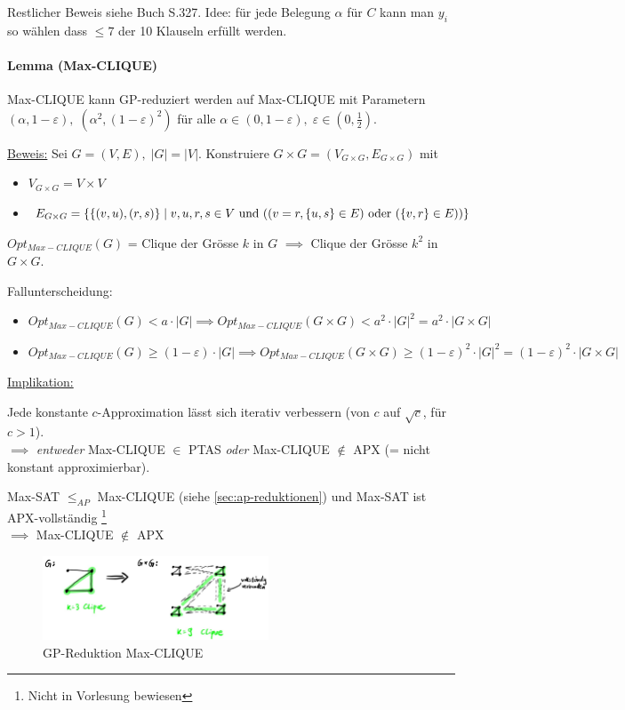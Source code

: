 Restlicher Beweis siehe Buch S.327.
Idee: für jede Belegung $\alpha$ für $C$ kann man $y_i$ so wählen dass $\leq 7$ der 10 Klauseln
erfüllt werden.

\paragraph{Lemma (Max-CLIQUE)}
Max-CLIQUE kann GP-reduziert werden auf Max-CLIQUE mit Parametern
$(\alpha, 1-\varepsilon), \; (\alpha^2, (1-\varepsilon)^2)$
für alle $\alpha \in (0, 1-\varepsilon), \; \varepsilon \in (0, \frac{1}{2})$.

\underline{Beweis:}
Sei $G=(V,E), \; |G|=|V|$.
Konstruiere $G \times G = ( V_{G \times G}, E_{G \times G} )$ mit
\begin{itemize}
    \item $V_{G \times G} = V \times V$
    \item $E_{G \times G} = \left\{ \{ (v,u) , (r,s) \} \; | \; v,u,r,s \in V \text{ und }
    ( ( v=r , \{u,s\} \in E) \text{ oder } (\{v,r\} \in E) ) \right\}$
\end{itemize}

$Opt_{Max-CLIQUE}(G)$ = Clique der Grösse $k$ in $G$ $\implies$ Clique der Grösse $k^2$ in $G \times G$.

Fallunterscheidung:
\begin{itemize}
    \item $ Opt_{Max-CLIQUE}(G) < a \cdot |G| \implies
        Opt_{Max-CLIQUE}(G \times G) < a^2 \cdot |G|^2 = a^2 \cdot |G \times G|$
    \item $ Opt_{Max-CLIQUE}(G) \geq (1-\varepsilon) \cdot |G| \implies
        Opt_{Max-CLIQUE}(G \times G) \geq (1-\varepsilon)^2 \cdot |G|^2 = (1-\varepsilon)^2 \cdot |G \times G|$
\end{itemize}

\underline{Implikation:}

Jede konstante $c$-Approximation lässt sich iterativ verbessern (von $c$ auf $\sqrt{c}$, für $c>1$). \\
$\implies$ \emph{entweder} Max-CLIQUE $\in$ PTAS \emph{oder} Max-CLIQUE $\notin$ APX
(= nicht konstant approximierbar).

Max-SAT $\leq_{AP}$ Max-CLIQUE (siehe \autoref{sec:ap-reduktionen}) und Max-SAT ist APX-vollständig
\footnote{Nicht in Vorlesung bewiesen} \\
$\implies$ Max-CLIQUE $\notin$ APX

\begin{figure}[h]
    \centering
    \includegraphics[width=0.6\textwidth]{images/gp-reduktion-max-clique.jpg}
    \caption{GP-Reduktion Max-CLIQUE}
\end{figure}
